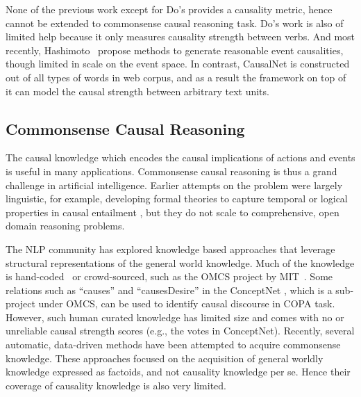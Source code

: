 \documentclass[letterpaper]{article}
\newcommand{\cut}[1]{}
\begin{document}
None of the previous work except for Do's provides a
causality metric, hence cannot be extended to commonsense causal
reasoning task. Do's work is also of limited help because it only
measures causality strength between verbs.
And most recently, Hashimoto~\cite{hashimoto2015generating} propose
methods to generate reasonable event causalities,
though limited in scale on the event space.  In contrast, CausalNet is
constructed out of all types of words in web corpus, and as a result
the framework on top of it can model the causal strength between
arbitrary text units.
\cut{
Much of the work ignored how the text spans surrounding the causal cue
affects the semantics. Our causal relation extraction
step, instead,  benefits from these contexts and
constructs a much larger and more powerful causal network.
Moreover, previous work
extracted specific types of causal pair, of either noun-noun, verb-verb or verb-noun
\cite{do2011minimally,riaz2014recognizing}
causality. None of the previous work except for
Do's~\shortcite{do2011minimally}
provides a numerical metric to measure causal strength,
hence cannot be extended to causal reasoning between short texts.
Do's work is also of limited help because it only
measures causal strength between verbs.
Recently, researchers \cite{hashimoto2015generating} also propose methods to
generate reasonable event causalities, though limited in scale.
Our CausalNet contains causal strength between arbitrary texts,
by using general web corpus and
extracting nouns, verbs, adjectives and
adverbs.}

\subsection{Commonsense Causal Reasoning}
The causal knowledge which encodes the causal implications of
actions and events is useful in many applications.
Commonsense causal reasoning is thus a
grand challenge in artificial intelligence. Earlier attempts on the
problem were largely linguistic, for example, developing formal
theories to capture temporal or logical properties in causal
entailment \cite{LascaridesAO92,lascarides:asher:1993a}, but
they do not scale to %
comprehensive, open domain reasoning problems.

The NLP community has explored knowledge based approaches
that leverage structural representations of the general world knowledge.
Much of the knowledge is hand-coded~\cite{lenat1995cyc}
or crowd-sourced, such as the OMCS project by MIT~\cite{singh2002open}.
Some relations such as ``causes'' and
``causesDesire'' in the ConceptNet \cite{liu2004commonsense},
which is a sub-project under OMCS, can be used to identify causal
discourse in COPA task.
However, such human curated knowledge
has limited size and comes with no or unreliable causal strength
scores (e.g., the votes in ConceptNet).
Recently, several automatic, data-driven methods have
been attempted to acquire commonsense
knowledge\cite{schubert2002can,gordon2010learning,gordon2010mining,akbikweltmodell}.
These approaches focused on the acquisition of general
worldly knowledge expressed as factoids, and not causality knowledge
per se. Hence their coverage of causality knowledge is also very limited.
\end{document}

